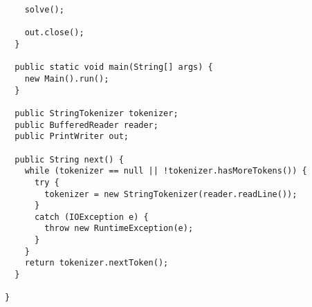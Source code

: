 \begin{lstlisting}
    solve();

    out.close();
  }

  public static void main(String[] args) {
    new Main().run();
  }

  public StringTokenizer tokenizer;
  public BufferedReader reader;
  public PrintWriter out;

  public String next() {
    while (tokenizer == null || !tokenizer.hasMoreTokens()) {
      try {
        tokenizer = new StringTokenizer(reader.readLine());
      }
      catch (IOException e) {
        throw new RuntimeException(e);
      }
    }
    return tokenizer.nextToken();
  }

}

\end{lstlisting}